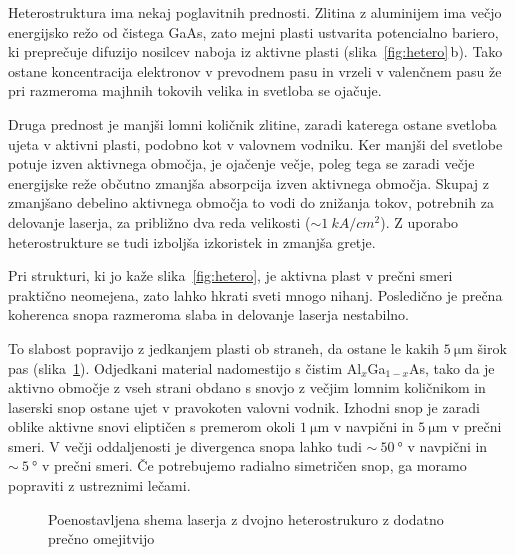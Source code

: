 Heterostruktura ima nekaj poglavitnih prednosti. Zlitina z aluminijem ima večjo 
energijsko režo od čistega GaAs, zato mejni plasti ustvarita potencialno bariero, 
ki preprečuje difuzijo nosilcev naboja iz aktivne plasti (slika~\ref{fig:hetero}\,b). Tako ostane koncentracija 
elektronov v prevodnem pasu in vrzeli v valenčnem pasu že pri razmeroma majhnih tokovih
velika in svetloba se ojačuje. 

Druga prednost je manjši lomni količnik zlitine, 
zaradi katerega ostane svetloba ujeta v aktivni plasti, podobno kot v valovnem 
vodniku. Ker manjši del svetlobe potuje izven aktivnega območja, je ojačenje večje,
poleg tega se zaradi večje energijske reže občutno zmanjša absorpcija izven aktivnega območja.
Skupaj z zmanjšano debelino aktivnega območja to vodi do znižanja tokov, 
potrebnih za delovanje laserja, za približno dva reda velikosti ($\sim 1~\si{kA}/\si{cm}^2$). 
Z uporabo heterostrukture se tudi izboljša izkoristek in zmanjša gretje.  

Pri strukturi, ki jo kaže slika~\ref{fig:hetero}, je aktivna plast v prečni smeri praktično neomejena, 
zato lahko hkrati sveti mnogo nihanj. Posledično je prečna koherenca snopa razmeroma slaba in 
delovanje laserja nestabilno. 

To slabost popravijo z jedkanjem plasti ob straneh, da ostane le
kakih $5~\si{\micro\meter}$ širok pas (slika~\ref{fig:heshema}). Odjedkani material nadomestijo s čistim Al$_x$Ga$_{1-x}$As, 
tako da je aktivno območje z vseh strani obdano s snovjo z večjim lomnim količnikom in laserski
snop ostane ujet v pravokoten valovni vodnik. Izhodni snop je zaradi oblike aktivne snovi eliptičen s 
premerom okoli $1~\si{\micro\meter}$ v navpični in $5~\si{\micro\meter}$ v prečni smeri. 
V večji oddaljenosti je divergenca snopa lahko tudi $\sim~50~\si{\degree}$ v navpični in $\sim~5~\si{\degree}$ 
v prečni smeri. Če potrebujemo radialno simetričen snop, ga moramo popraviti z ustreznimi 
lečami.
\begin{figure}[ht]
\centering
\def\svgwidth{85truemm} 

\caption{Poenostavljena shema laserja z dvojno heterostrukuro z dodatno prečno omejitvijo
}
\label{fig:heshema}
\end{figure}

